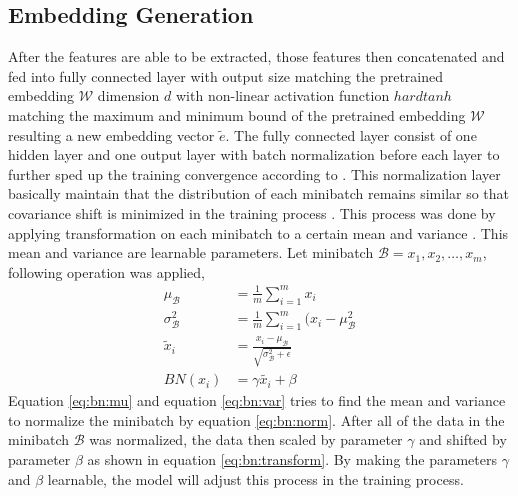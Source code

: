     \subsection{Embedding Generation}
        After the features are able to be extracted, those features
        then concatenated and fed into fully connected layer with
        output size matching the pretrained embedding $\mathcal{W}$
        dimension $d$ with non-linear activation function $hardtanh$
        matching the maximum and minimum bound of the pretrained
        embedding $\mathcal{W}$ resulting a new embedding vector
        $\tilde{e}$. The fully connected layer consist of one hidden
        layer and one output layer with batch normalization before
        each layer to further sped up the training convergence
        according to \cite{batchnorm:DBLP:journals/corr/IoffeS15}.
        This normalization layer basically maintain that the
        distribution of each minibatch remains similar so that
        covariance shift is minimized in the training process
        \citep{batchnorm:DBLP:journals/corr/IoffeS15}. This process
        was done by applying transformation on each minibatch to a
        certain mean and variance
        \citep{batchnorm:DBLP:journals/corr/IoffeS15}. This mean and
        variance are learnable parameters. Let minibatch $\mathcal{B}
        = {x_1, x_2, \dots, x_m}$, following operation was applied,
        \begin{align}
            \label{eq:bn:mu}
            \mu_{\mathcal{B}} &= \frac{1}{m} \sum_{i=1}^m x_i\\
            \label{eq:bn:var}
            \sigma^2_{\mathcal{B}} &= \frac{1}{m} \sum_{i=1}^m (x_i - \mu_{\mathcal{B}}^2\\
            \label{eq:bn:norm}            
            \tilde{x}_i &= \frac{x_i - \mu_{\mathcal{B}}}{\sqrt{\sigma^2_{\mathcal{B}} + \epsilon}}\\
            \label{eq:bn:transform}            
            BN(x_i) &= \gamma\tilde{x_i} + \beta
        \end{align}
        Equation \ref{eq:bn:mu} and equation \ref{eq:bn:var} tries to
        find the mean and variance to normalize the minibatch by
        equation \ref{eq:bn:norm}. After all of the data in the
        minibatch $\mathcal{B}$ was normalized, the data then scaled
        by parameter $\gamma$ and shifted by parameter $\beta$ as
        shown in equation \ref{eq:bn:transform}. By making the
        parameters $\gamma$ and $\beta$ learnable, the model will
        adjust this process in the training process.

